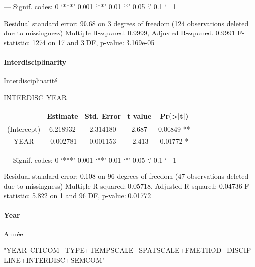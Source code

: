 ---
Signif. codes:  0 ‘***’ 0.001 ‘**’ 0.01 ‘*’ 0.05 ‘.’ 0.1 ‘ ’ 1

Residual standard error: 90.68 on 3 degrees of freedom
  (124 observations deleted due to missingness)
Multiple R-squared:  0.9999,	Adjusted R-squared:  0.9991 
F-statistic:  1274 on 17 and 3 DF,  p-value: 3.169e-05




\paragraph{Interdisciplinarity}{Interdisciplinarité}


INTERDISC~YEAR

\begin{tabular}{|c|c|c|c|c|}
\hline
            & Estimate & Std. Error & t value & Pr(>|t|)   \\\hline
(Intercept) & 6.218932 &  2.314180  & 2.687 & 0.00849 ** \\
YEAR       & -0.002781 &  0.001153  & -2.413 & 0.01772 * \\\hline
\end{tabular}

---
Signif. codes:  0 ‘***’ 0.001 ‘**’ 0.01 ‘*’ 0.05 ‘.’ 0.1 ‘ ’ 1

Residual standard error: 0.108 on 96 degrees of freedom
  (47 observations deleted due to missingness)
Multiple R-squared:  0.05718,	Adjusted R-squared:  0.04736 
F-statistic: 5.822 on 1 and 96 DF,  p-value: 0.01772


\paragraph{Year}{Année}

"YEAR~CITCOM+TYPE+TEMPSCALE+SPATSCALE+FMETHOD+DISCIPLINE+INTERDISC+SEMCOM"

